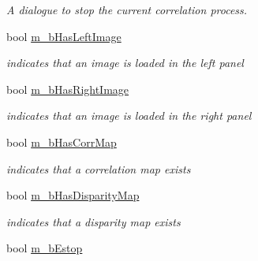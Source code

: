 \begin{CompactItemize}
\begin{CompactList}\small\item\em A dialogue to stop the current correlation process. \item\end{CompactList}\item 
\hypertarget{classQcorr_b5325b11a64e24eeb6b9bdc27a77d0ad}{
bool \hyperlink{classQcorr_b5325b11a64e24eeb6b9bdc27a77d0ad}{m\_\-bHasLeftImage}}
\label{classQcorr_b5325b11a64e24eeb6b9bdc27a77d0ad}

\begin{CompactList}\small\item\em indicates that an image is loaded in the left panel \item\end{CompactList}\item 
\hypertarget{classQcorr_a4afa1daa72ecf6caae74f6ced4ec251}{
bool \hyperlink{classQcorr_a4afa1daa72ecf6caae74f6ced4ec251}{m\_\-bHasRightImage}}
\label{classQcorr_a4afa1daa72ecf6caae74f6ced4ec251}

\begin{CompactList}\small\item\em indicates that an image is loaded in the right panel \item\end{CompactList}\item 
\hypertarget{classQcorr_40e40bfd5cc79d8abf6e7b41465f440e}{
bool \hyperlink{classQcorr_40e40bfd5cc79d8abf6e7b41465f440e}{m\_\-bHasCorrMap}}
\label{classQcorr_40e40bfd5cc79d8abf6e7b41465f440e}

\begin{CompactList}\small\item\em indicates that a correlation map exists \item\end{CompactList}\item 
\hypertarget{classQcorr_42ef5dadd6c1ff9f560de8cb1f43c2c6}{
bool \hyperlink{classQcorr_42ef5dadd6c1ff9f560de8cb1f43c2c6}{m\_\-bHasDisparityMap}}
\label{classQcorr_42ef5dadd6c1ff9f560de8cb1f43c2c6}

\begin{CompactList}\small\item\em indicates that a disparity map exists \item\end{CompactList}\item 
\hypertarget{classQcorr_db31096514465f8c4a1993345d98f1eb}{
bool \hyperlink{classQcorr_db31096514465f8c4a1993345d98f1eb}{m\_\-bEstop}}
\label{classQcorr_db31096514465f8c4a1993345d98f1eb}


\end{CompactItemize}
